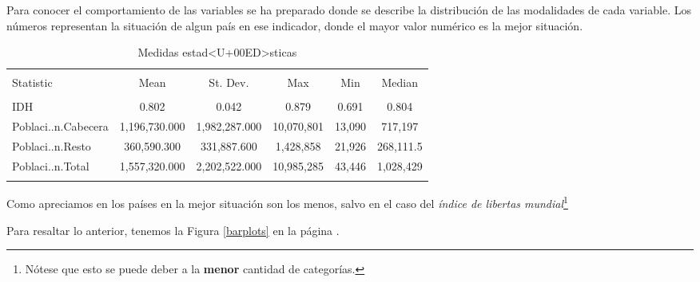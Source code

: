 \documentclass{article}
\begin{document}
Para conocer el comportamiento de las variables se ha preparado  donde se describe la distribuci\'on de las modalidades de cada variable. Los n\'umeros representan la situaci\'on de algun pa\'is en ese indicador, donde el mayor valor num\'erico es la mejor situaci\'on.



\begin{table}[!htbp] \centering 
  \caption{Medidas estad<U+00ED>sticas} 
  \label{stats} 
\begin{tabular}{@{\extracolsep{5pt}}lccccc} 
\\[-1.8ex]\hline 
\hline \\[-1.8ex] 
Statistic & \multicolumn{1}{c}{Mean} & \multicolumn{1}{c}{St. Dev.} & \multicolumn{1}{c}{Max} & \multicolumn{1}{c}{Min} & \multicolumn{1}{c}{Median} \\ 
\hline \\[-1.8ex] 
IDH & 0.802 & 0.042 & 0.879 & 0.691 & 0.804 \\ 
Poblaci..n.Cabecera & 1,196,730.000 & 1,982,287.000 & 10,070,801 & 13,090 & 717,197 \\ 
Poblaci..n.Resto & 360,590.300 & 331,887.600 & 1,428,858 & 21,926 & 268,111.5 \\ 
Poblaci..n.Total & 1,557,320.000 & 2,202,522.000 & 10,985,285 & 43,446 & 1,028,429 \\ 
\hline \\[-1.8ex] 
\end{tabular} 
\end{table} 
Como apreciamos en  los pa\'ises en la mejor situaci\'on son los menos, salvo en el caso del \emph{\'indice de libertas mundial}\footnote{N\'otese que esto se puede deber a la {\bf menor} cantidad de categor\'ias.}

\clearpage

Para resaltar lo anterior, tenemos la Figura \ref{barplots} en la p\'agina \pageref{barplots}. 
\end{document}

